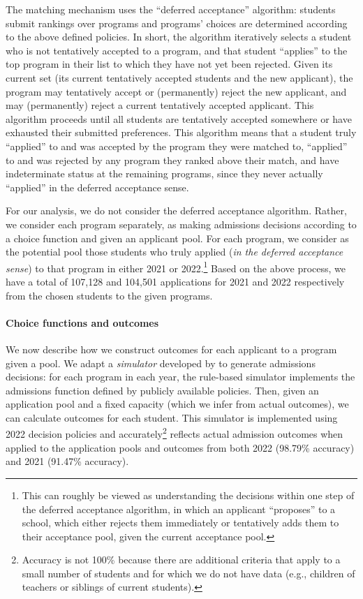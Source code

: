 \documentclass[letterpaper]{article}
\begin{document}
The matching mechanism uses the ``deferred acceptance'' algorithm: students submit rankings over programs and programs' choices are determined according to the above defined policies. In short, the algorithm iteratively selects a student who is not tentatively accepted to a program, and that student ``applies'' to the top program in their list to which they have not yet been rejected. Given its current set (its current tentatively accepted students and the new applicant), the program may tentatively accept or (permanently) reject the new applicant, and may (permanently) reject a current tentatively accepted applicant. This algorithm proceeds until all students are tentatively accepted somewhere or have exhausted their submitted preferences. This algorithm means that a student truly ``applied'' to and was accepted by the program they were matched to, ``applied'' to and was rejected by any program they ranked above their match, and have indeterminate status at the remaining programs, since they never actually ``applied'' in the deferred acceptance sense.

For our analysis, we do not consider the deferred acceptance algorithm. Rather, we consider each program separately, as making admissions decisions according to a choice function and given an applicant pool. For each program, we consider as the potential pool those students who truly applied (\textit{in the deferred acceptance sense}) to that program in either 2021 or 2022.\footnote{This can roughly be viewed as understanding the decisions within one step of the deferred acceptance algorithm, in which an applicant ``proposes'' to a school, which either rejects them immediately or tentatively adds them to their acceptance pool, given the current acceptance pool.} Based on the above process, we have a total of 107,128 and 104,501 applications for 2021 and 2022 respectively from the chosen students to the given programs.

\paragraph{Choice functions and outcomes}
We now describe how we construct outcomes for each applicant to a program given a pool. We adapt a \textit{simulator} developed by \citet{peng2025undermatching} to generate admissions decisions: for each program in each year, the rule-based simulator implements the admissions function defined by publicly available policies.
Then, given an application pool and a fixed capacity  (which we infer from actual outcomes), we can calculate outcomes for each student. This simulator is implemented using 2022 decision policies and accurately\footnote{Accuracy is not 100\% because there are additional criteria that apply to a small number of students and for which we do not have data (e.g., children of teachers or siblings of current students).} reflects actual admission outcomes when applied to the application pools and outcomes from both 2022 (98.79\% accuracy) and 2021 (91.47\% accuracy).
\end{document}
